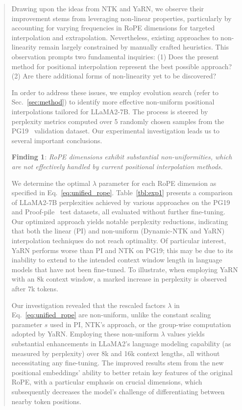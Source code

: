\begin{abstract}
Drawing upon the ideas from NTK and YaRN, we observe their improvement stems from leveraging non-linear properties, particularly by accounting for varying frequencies in RoPE dimensions for targeted interpolation and extrapolation. Nevertheless, existing approaches to non-linearity remain largely constrained by manually crafted heuristics. This observation prompts two fundamental inquiries: (1) Does the present method for positional interpolation represent the best possible approach? (2) Are there additional forms of non-linearity yet to be discovered?

In order to address these issues, we employ evolution search (refer to Sec.~\ref{sec:method}) to identify more effective non-uniform positional interpolations tailored for LLaMA2-7B. The process is steered by perplexity metrics computed over 5 randomly chosen samples from the PG19~\cite{pg19} validation dataset. Our experimental investigation leads us to several important conclusions.

\textbf{Finding 1}: \textit{RoPE dimensions exhibit substantial non-uniformities, which are not effectively handled by current positional interpolation methods.}

We determine the optimal $\lambda$ parameter for each RoPE dimension as specified in Eq.~\ref{eq:unified_rope}. Table~\ref{tbl:exp1} presents a comparison of LLaMA2-7B perplexities achieved by various approaches on the PG19 and Proof-pile~\cite{proof-pile} test datasets, all evaluated without further fine-tuning. Our optimized approach yields notable perplexity reductions, indicating that both the linear (PI) and non-uniform (Dynamic-NTK and YaRN) interpolation techniques do not reach optimality. Of particular interest, YaRN performs worse than PI and NTK on PG19; this may be due to its inability to extend to the intended context window length in language models that have not been fine-tuned. To illustrate, when employing YaRN with an 8k context window, a marked increase in perplexity is observed after 7k tokens.

Our investigation revealed that the rescaled factors $\lambda$ in Eq.~\ref{eq:unified_rope} are non-uniform, unlike the constant scaling parameter $s$ used in PI, NTK’s approach, or the group-wise computation adopted by YaRN. Employing these non-uniform $\lambda$ values yields substantial enhancements in LLaMA2's language modeling capability (as measured by perplexity) over 8k and 16k context lengths, all without necessitating any fine-tuning. The improved results stem from the new positional embeddings' ability to better retain key features of the original RoPE, with a particular emphasis on crucial dimensions, which subsequently decreases the model’s challenge of differentiating between nearby token positions.


\end{abstract}

